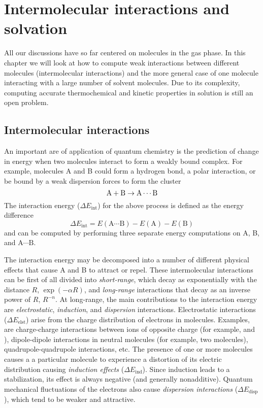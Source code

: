 \documentclass[../Main/notes.tex]{subfiles}
\begin{document}
\chapter{Intermolecular interactions and solvation}

All our discussions have so far centered on molecules in the gas phase.
In this chapter we will look at how to compute weak interactions between different molecules (intermolecular interactions) and the more general case of one molecule interacting with a large number of solvent molecules.
Due to its complexity, computing accurate thermochemical and kinetic properties in solution is still an open problem.

\section{Intermolecular interactions}

An important are of application of quantum chemistry is the prediction of change in energy when two molecules interact to form a weakly bound complex.
For example, molecules A and B could form a hydrogen bond, a polar interaction, or be bound by a weak dispersion forces to form the cluster 
\begin{equation}
\ce{A + B} \rightarrow \ce{A\cdots B}
\end{equation}
The interaction energy ($\Delta E_\text{int}$) for the above process is defined as the energy difference
\begin{equation}
\Delta E_\text{int} = E(\text{A}\cdots \text{B}) - E(\text{A}) - E(\text{B})
\end{equation}
and can be computed by performing three separate energy computations on A, B, and $\text{A}\cdots \text{B}$.

The interaction energy may be decomposed into a number of different physical effects that cause A and B to attract or repel.
These intermolecular interactions can be first of all divided into \emph{short-range}, which decay as exponentially with the distance $R$, $\exp(-\alpha R)$, and \emph{long-range} interactions that decay as an inverse power of $R$, $R^{-n}$.
At long-range, the main contributions to the interaction energy are \emph{electrostatic}, \emph{induction}, and \emph{dispersion} interactions.
Electrostatic interactions ($\Delta E_\text{elst}$) arise from the charge distribution of electrons in molecules.
Examples, are charge-charge interactions between ions of opposite charge (for example,  and ), dipole-dipole interactions in neutral molecules (for example, two  molecules), quadrupole-quadrupole interactions, etc.
The presence of one or more molecules causes a a particular molecule to experience a distortion of its electric distribution causing \emph{induction effects} ($\Delta E_\text{ind}$). Since induction leads to a stabilization, its effect is always negative (and generally nonadditive).
Quantum mechanical fluctuations of the electrons also cause \emph{dispersion interactions} ($\Delta E_\text{disp}$), which tend to be weaker and attractive.
\end{document}
